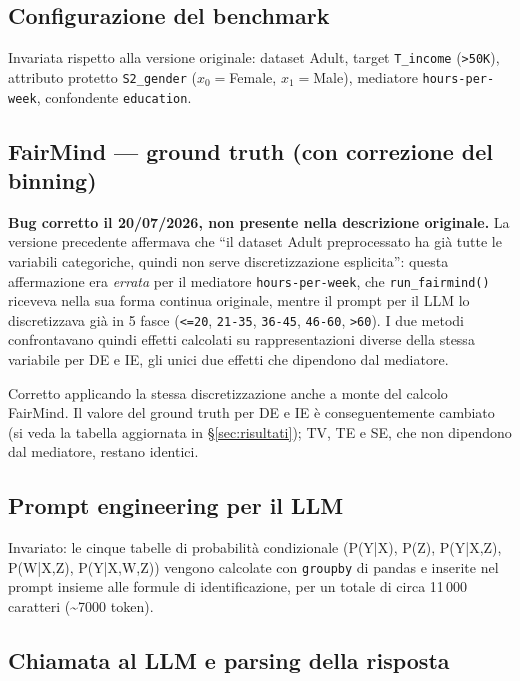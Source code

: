 \subsection{Configurazione del benchmark}

Invariata rispetto alla versione originale: dataset Adult, target \texttt{T\_income} (\texttt{>50K}), attributo protetto \texttt{S2\_gender} ($x_0{=}$Female, $x_1{=}$Male), mediatore \texttt{hours-per-week}, confondente \texttt{education}.

\subsection{FairMind --- ground truth (con correzione del binning)}
\label{sec:binning-fix}

\textbf{Bug corretto il 20/07/2026, non presente nella descrizione originale.} La versione precedente affermava che ``il dataset Adult preprocessato ha gi\`a tutte le variabili categoriche, quindi non serve discretizzazione esplicita'': questa affermazione era \emph{errata} per il mediatore \texttt{hours-per-week}, che \texttt{run\_fairmind()} riceveva nella sua forma continua originale, mentre il prompt per il LLM lo discretizzava gi\`a in 5 fasce (\texttt{<=20}, \texttt{21-35}, \texttt{36-45}, \texttt{46-60}, \texttt{>60}). I due metodi confrontavano quindi effetti calcolati su rappresentazioni diverse della stessa variabile per DE e IE, gli unici due effetti che dipendono dal mediatore.

Corretto applicando la stessa discretizzazione anche a monte del calcolo FairMind. Il valore del ground truth per DE e IE \`e conseguentemente cambiato (si veda la tabella aggiornata in \S\ref{sec:risultati}); TV, TE e SE, che non dipendono dal mediatore, restano identici.

\subsection{Prompt engineering per il LLM}

Invariato: le cinque tabelle di probabilit\`a condizionale (P(Y|X), P(Z), P(Y|X,Z), P(W|X,Z), P(Y|X,W,Z)) vengono calcolate con \texttt{groupby} di pandas e inserite nel prompt insieme alle formule di identificazione, per un totale di circa 11\,000 caratteri (\textasciitilde 7000 token).

\subsection{Chiamata al LLM e parsing della risposta}

